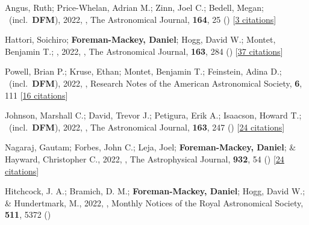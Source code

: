 \item[{\color{numcolor}\scriptsize83}] Angus, Ruth; Price-Whelan, Adrian M.; Zinn, Joel C.; Bedell, Megan; \etal\ (incl.\ \textbf{DFM}), 2022, , The Astronomical Journal, \textbf{164}, 25 () [\href{https://ui.adsabs.harvard.edu/abs/2022AJ....164...25A}{3 citations}]

\item[{\color{numcolor}\scriptsize82}] Hattori, Soichiro; \textbf{Foreman-Mackey, Daniel}; Hogg, David W.; Montet, Benjamin T.; \etal, 2022, , The Astronomical Journal, \textbf{163}, 284 () [\href{https://ui.adsabs.harvard.edu/abs/2022AJ....163..284H}{37 citations}]

\item[{\color{numcolor}\scriptsize81}] Powell, Brian P.; Kruse, Ethan; Montet, Benjamin T.; Feinstein, Adina D.; \etal\ (incl.\ \textbf{DFM}), 2022, , Research Notes of the American Astronomical Society, \textbf{6}, 111 [\href{https://ui.adsabs.harvard.edu/abs/2022RNAAS...6..111P}{16 citations}]

\item[{\color{numcolor}\scriptsize80}] Johnson, Marshall C.; David, Trevor J.; Petigura, Erik A.; Isaacson, Howard T.; \etal\ (incl.\ \textbf{DFM}), 2022, , The Astronomical Journal, \textbf{163}, 247 () [\href{https://ui.adsabs.harvard.edu/abs/2022AJ....163..247J}{24 citations}]

\item[{\color{numcolor}\scriptsize79}] Nagaraj, Gautam; Forbes, John C.; Leja, Joel; \textbf{Foreman-Mackey, Daniel}; \& Hayward, Christopher C., 2022, , The Astrophysical Journal, \textbf{932}, 54 () [\href{https://ui.adsabs.harvard.edu/abs/2022ApJ...932...54N}{24 citations}]

\item[{\color{numcolor}\scriptsize78}] Hitchcock, J. A.; Bramich, D. M.; \textbf{Foreman-Mackey, Daniel}; Hogg, David W.; \& Hundertmark, M., 2022, , Monthly Notices of the Royal Astronomical Society, \textbf{511}, 5372 ()

